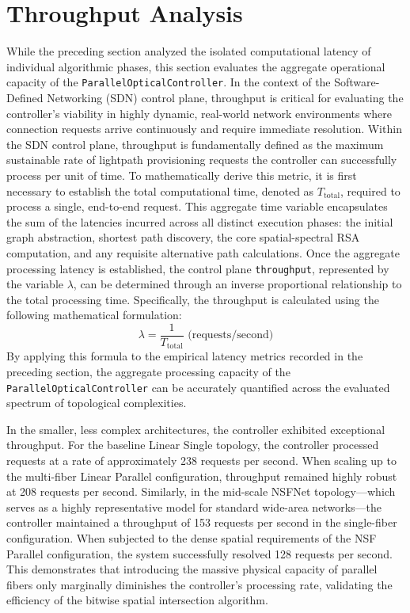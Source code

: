 \section{Throughput Analysis}
While the preceding section analyzed the isolated computational latency of individual algorithmic phases, this section evaluates the aggregate operational capacity of the \texttt{ParallelOpticalController}. In the context of the Software-Defined Networking (SDN) control plane, throughput is critical for evaluating the controller's viability in highly dynamic, real-world network environments where connection requests arrive continuously and require immediate resolution. Within the SDN control plane, throughput is fundamentally defined as the maximum sustainable rate of lightpath provisioning requests the controller can successfully process per unit of time. To mathematically derive this metric, it is first necessary to establish the total computational time, denoted as $T_{\text{total}}$, required to process a single, end-to-end request. This aggregate time variable encapsulates the sum of the latencies incurred across all distinct execution phases: the initial graph abstraction, shortest path discovery, the core spatial-spectral RSA computation, and any requisite alternative path calculations. Once the aggregate processing latency is established, the control plane \texttt{throughput}, represented by the variable $\lambda$, can be determined through an inverse proportional relationship to the total processing time. Specifically, the throughput is calculated using the following mathematical formulation:
\[
    \lambda=\frac{1}{T_{\text{total}}} \text{ (requests/second)}
\]
By applying this formula to the empirical latency metrics recorded in the preceding section, the aggregate processing capacity of the \texttt{ParallelOpticalController} can be accurately quantified across the evaluated spectrum of topological complexities.

In the smaller, less complex architectures, the controller exhibited exceptional throughput. For the baseline Linear Single topology, the controller processed requests at a rate of approximately 238 requests per second. When scaling up to the multi-fiber Linear Parallel configuration, throughput remained highly robust at 208 requests per second. Similarly, in the mid-scale NSFNet topology—which serves as a highly representative model for standard wide-area networks—the controller maintained a throughput of 153 requests per second in the single-fiber configuration. When subjected to the dense spatial requirements of the NSF Parallel configuration, the system successfully resolved 128 requests per second. This demonstrates that introducing the massive physical capacity of parallel fibers only marginally diminishes the controller's processing rate, validating the efficiency of the bitwise spatial intersection algorithm.

